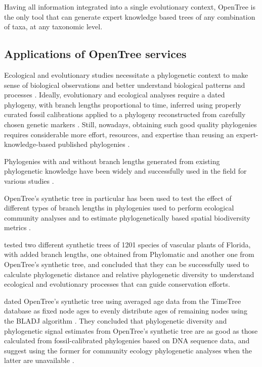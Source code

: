 \documentclass[oupdraft]{sysbio_sse}
\begin{document}
Having all information integrated into a single evolutionary context, OpenTree
is the only tool that can generate expert knowledge based trees of any combination
of taxa, at any taxonomic level.


\subsection{Applications of OpenTree services}

Ecological and evolutionary studies necessitate a phylogenetic context to make sense of biological
observations and better understand biological patterns and processes
\citep{felsenstein1985phylogenies, soltis2003role}.
Ideally, evolutionary and ecological analyses require a dated phylogeny, with branch lengths
proportional to time, inferred using properly curated fossil calibrations applied
to a phylogeny reconstructed from carefully chosen genetic markers \citep{webb2008phylocom, jantzen2019effects}.
Still, nowadays, obtaining such good quality phylogenies requires
considerable more effort, resources, and expertise than reusing an expert-knowledge-based
published phylogenies \citep{li2019common}.

Phylogenies with and without branch lengths generated from
existing phylogenetic knowledge have been widely and successfully used in the field
for various studies \citep{webb2005phylomatic, allen2019spatial}.

OpenTree's synthetic tree in particular has been used to test the effect of
different types of branch lengths in phylogenies used to perform ecological community
analyses and to estimate phylogenetically based spatial biodiversity metrics
\citep{allen2019spatial, li2019common}.

\citep{allen2019spatial} tested two different synthetic trees of 1201 species of vascular plants of Florida,
with added branch lengths,
one obtained from Phylomatic and another one from OpenTree's synthetic tree,
and concluded that they can be successfully used
to calculate phylogenetic distance and relative phylogenetic diversity to understand
ecological and evolutionary processes that can guide conservation efforts.

\citep{li2019common} dated OpenTree's synthetic tree using averaged age data from
the TimeTree database \citep{kumar2017timetree} as fixed node ages to evenly distribute ages of remaining
nodes using the BLADJ algorithm \citep{webb2008phylocom}. They concluded that phylogenetic diversity
and phylogenetic signal estimates from OpenTree's synthetic tree are as good
as those calculated from fossil-calibrated phylogenies based on DNA sequence data,
and suggest using the former for community ecology phylogenetic analyses when the
latter are unavailable \citep{li2019common}.
\end{document}
